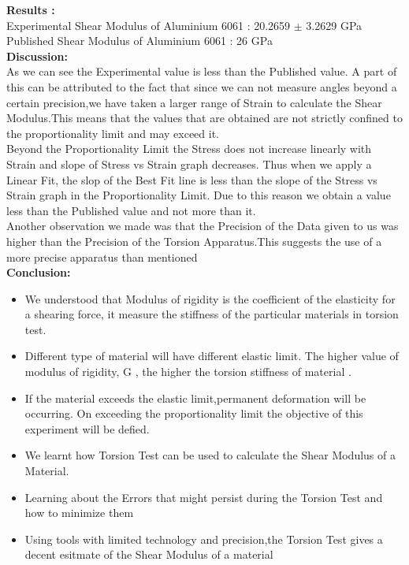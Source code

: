 \documentclass[12pt,a4paper]{article}	%
\begin{document}
\textbf{Results :}\\
Experimental Shear Modulus of Aluminium 6061 : 20.2659 $\pm$ 3.2629 GPa\\
Published Shear Modulus of Aluminium 6061 : 26 GPa\\

\break
\textbf{Discussion:}\\
As we can see the Experimental value is less than the Published value. A part of this can be attributed to the fact that since we can not measure angles beyond a certain precision,we have taken a larger range of Strain to calculate the Shear Modulus.This means that the values that are obtained are not strictly confined to the proportionality limit and may exceed it.\\

Beyond the Proportionality Limit the Stress does not increase linearly with Strain and slope of Stress vs Strain graph decreases. Thus when we apply a Linear Fit, the slop of the Best Fit line is less than the slope of the Stress vs Strain graph in the Proportionality Limit.
Due to this reason we obtain a value less than the Published value and not more than it.\\


Another observation we made was that the Precision of the Data given to us was higher than the Precision of the Torsion Apparatus.This suggests the use of a more precise apparatus than mentioned\\

\textbf{Conclusion:}
\begin{itemize}
\item We understood that Modulus of rigidity is the coefficient of the elasticity for a shearing force, it measure the stiffness of the particular materials in torsion test. 
\item Different type of material will have different elastic limit. The higher value of modulus of rigidity, G , the higher the torsion stiffness of material .
\item If the material exceeds the elastic limit,permanent deformation will be occurring. On exceeding the proportionality limit the objective of this experiment will be defied.
\item We learnt how Torsion Test can be used to calculate the Shear Modulus of a Material.
\item Learning about the Errors that might persist during the Torsion Test and how to minimize them
\item Using tools with limited technology and precision,the Torsion Test gives a decent esitmate of the Shear Modulus of a material

\end{itemize}

\thispagestyle{empty}	%
\end{document}
